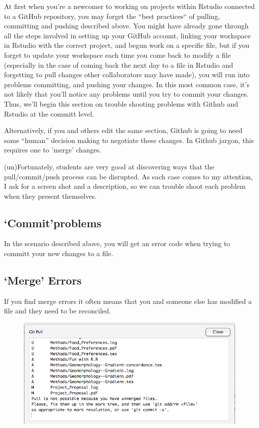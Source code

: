 \documentclass[12pt]{../SOP3_beta}
\begin{document}
\NP At first when you're a newcomer to working on projects within Rstudio connected to a GitHub repository, you may forget the ``best practices`` of pulling, committing and pushing described above. You might have already gone through all the steps involved in setting up your GitHub account, linking your workspace in Rstudio with the correct project, and begun work on a specific file, but if you forget to update your workspace each time you come back to modify a file (especially in the case of coming back the next day to a file in Rstudio and forgetting to pull changes other collaborators may have made), you will run into problems committing, and pushing your changes. In this most common case, it's not likely that you'll notice any problems until you try to commit your changes. Thus, we'll begin this section on trouble shooting problems with Github and Rstudio at the committ level.

\NP Alternatively, if you and others edit the same section, Github is going to need some ``human'' decision making to negotiate these changes. In Github jargon, this requires one to 'merge' changes. 

\NP (un)Fortunately, students are very good at discovering ways that the pull/commit/push process can be disrupted. As each case comes to my attention, I ask for a screen shot and a description, so we can trouble shoot each problem when they present themselves.

\subsection{`Commit'problems}
\NP In the scenario described above, you will get an error code when trying to committ your new changes to a file. 

\subsection{`Merge' Errors}

\NP If you find merge errors it often means that you and someone else has modified a file and they need to be reconciled.

\begin{figure}
\includegraphics{graphics/UnmergedError.jpg}
\end{figure}
\end{document}
